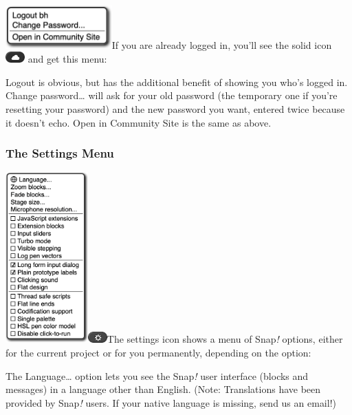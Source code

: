 \includegraphics[width=1.61111in,height=0.65278in]{media/image1007.png}If
you are already logged in, you'll see the solid icon
\includegraphics[width=0.29167in,height=0.16667in]{media/image1008.png}
and get this menu:

Logout is obvious, but has the additional benefit of showing you who's
logged in. Change password\ldots{} will ask for your old password (the
temporary one if you're resetting your password) and the new password
you want, entered twice because it doesn't echo. Open in Community Site
is the same as above.

\subsubsection{\texorpdfstring{\hfill\break
The Settings Menu}{ The Settings Menu}}\label{the-settings-menu}

\includegraphics[width=1.24792in,height=2.58333in]{media/image1009.png}\includegraphics[width=0.29167in,height=0.16667in]{media/image1010.png}The
settings icon shows a menu of Snap\emph{!} options, either for the
current project or for you permanently, depending on the option:

The Language\ldots{} option lets you see the Snap\emph{!} user interface
(blocks and messages) in a language other than English. (Note:
Translations have been provided by Snap\emph{!} users. If your native
language is missing, send us an email!)

